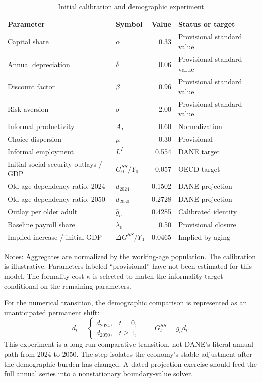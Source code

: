 \documentclass[12pt]{article}
\begin{document}
\begin{table}[!htbp]
\centering
\caption{Initial calibration and demographic experiment}
\label{tab:calibration}
\begin{threeparttable}
\small
\begin{tabular}{@{}llrl@{}}
\toprule
Parameter & Symbol & Value & Status or target \\
\midrule
Capital share & $\alpha$ & 0.33 & Provisional standard value \\
Annual depreciation & $\delta$ & 0.06 & Provisional standard value \\
Discount factor & $\beta$ & 0.96 & Provisional standard value \\
Risk aversion & $\sigma$ & 2.00 & Provisional standard value \\
Informal productivity & $A_I$ & 0.60 & Normalization \\
Choice dispersion & $\mu$ & 0.30 & Provisional \\
Informal employment & $L^I$ & 0.554 & DANE target \\
Initial social-security outlays / GDP & $G_0^{SS}/Y_0$ & 0.057 & OECD target \\
Old-age dependency ratio, 2024 & $d_{2024}$ & 0.1502 & DANE projection \\
Old-age dependency ratio, 2050 & $d_{2050}$ & 0.2728 & DANE projection \\
Outlay per older adult & $\bar g_o$ & 0.4285 & Calibrated identity \\
Baseline payroll share & $\lambda_0$ & 0.50 & Provisional closure \\
Implied increase / initial GDP & $\Delta G^{SS}/Y_0$ & 0.0465 & Implied by aging \\
\bottomrule
\end{tabular}
\begin{tablenotes}[flushleft]\footnotesize
\item Notes: Aggregates are normalized by the working-age population. The
calibration is illustrative. Parameters labeled ``provisional'' have not been
estimated for this model. The formality cost $\kappa$ is selected to match the
informality target conditional on the remaining parameters.
\end{tablenotes}
\end{threeparttable}
\end{table}

For the numerical transition, the demographic comparison is represented as an
unanticipated permanent shift:
\begin{equation}
  d_t=
  \begin{cases}
    d_{2024}, & t=0,\\
    d_{2050}, & t\geq1,
  \end{cases}
  \qquad
  G_t^{SS}=\bar g_o d_t.
  \label{eq:spending_path}
\end{equation}
This experiment is a long-run comparative transition, not DANE's literal
annual path from 2024 to 2050. The step isolates the economy's stable adjustment
after the demographic burden has changed. A dated projection exercise should
feed the full annual series into a nonstationary boundary-value solver.
\end{document}
